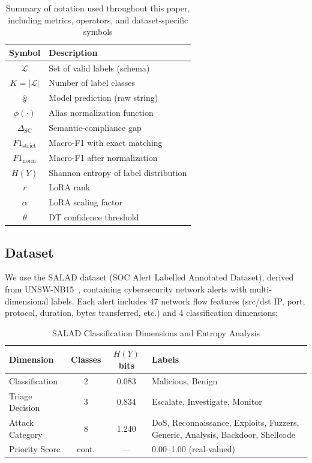 \documentclass[journal]{IEEEtran}
\begin{document}
\begin{table}[!ht]
\centering
\caption{Summary of notation used throughout this paper, including metrics, operators, and dataset-specific symbols}
\label{tab:notation}
\begin{tabular}{cl}
\toprule
\textbf{Symbol} & \textbf{Description} \\
\midrule
$\mathcal{L}$ & Set of valid labels (schema) \\
$K = |\mathcal{L}|$ & Number of label classes \\
$\hat{y}$ & Model prediction (raw string) \\
$\phi(\cdot)$ & Alias normalization function \\
$\Delta_\text{SC}$ & Semantic-compliance gap \\
$F1_\text{strict}$ & Macro-F1 with exact matching \\
$F1_\text{norm}$ & Macro-F1 after normalization \\
$H(Y)$ & Shannon entropy of label distribution \\
$r$ & LoRA rank \\
$\alpha$ & LoRA scaling factor \\
$\theta$ & DT confidence threshold \\
\bottomrule
\end{tabular}
\end{table}

\subsection{Dataset}
We use the SALAD dataset (SOC Alert Labelled Annotated Dataset), derived from UNSW-NB15~\cite{moustafa2016}, containing cybersecurity network alerts with multi-dimensional labels. Each alert includes 47 network flow features (src/dst IP, port, protocol, duration, bytes transferred, etc.) and 4 classification dimensions:

\begin{table}[!ht]
\centering
\caption{SALAD Classification Dimensions and Entropy Analysis}
\label{tab:dimensions}
\begin{tabular}{lccp{3.5cm}}
\toprule
\textbf{Dimension} & \textbf{Classes} & \textbf{$H(Y)$ bits} & \textbf{Labels} \\
\midrule
Classification & 2 & 0.083 & Malicious, Benign \\
Triage Decision & 3 & 0.834 & Escalate, Investigate, Monitor \\
Attack Category & 8 & 1.240 & DoS, Reconnaissance, Exploits, Fuzzers, Generic, Analysis, Backdoor, Shellcode \\
Priority Score & cont. & --- & 0.00--1.00 (real-valued) \\
\bottomrule
\end{tabular}
\end{table}
\end{document}
